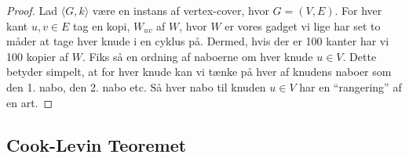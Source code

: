 \begin{proof}
  Lad $\langle G,k \rangle $ være en instans af vertex-cover, hvor $G = (V,E)$. For hver kant $u,v \in E$ tag en kopi, $W_{uv}$ af $W$, hvor $W$ er vores gadget vi lige har set to måder at tage hver knude i en cyklus på. Dermed, hvis der er 100 kanter har vi 100 kopier af $W$. Fiks så en ordning af naboerne om hver knude $u \in V$. Dette betyder simpelt, at for hver knude kan vi tænke på hver af knudens naboer som den 1. nabo, den 2. nabo etc. Så hver nabo til knuden $u \in V$ har en ``rangering'' af en art.

\end{proof}

\subsection{Cook-Levin Teoremet}%
\label{subsec:cooklevin}






